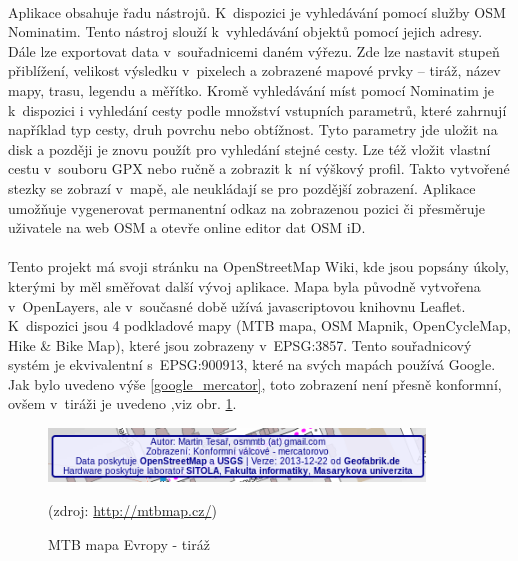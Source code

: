 \documentclass[11pt,a4paper,titlepage,oneside]{book}
\begin{document}
		\paragraph{} Aplikace obsahuje řadu nástrojů. K~dispozici je vyhledávání pomocí služby \ac{OSM} Nominatim\cite{nominatim}. Tento nástroj slouží k~vyhledávání objektů pomocí jejich adresy. Dále lze exportovat data v~souřadnicemi daném výřezu. Zde lze nastavit stupeň přiblížení, velikost výsledku v~pixelech a zobrazené mapové prvky -- tiráž, název mapy, trasu, legendu a měřítko. Kromě vyhledávání míst  pomocí Nominatim je k~dispozici i vyhledání cesty podle množství vstupních parametrů, které zahrnují například typ cesty, druh povrchu nebo obtížnost. Tyto parametry jde uložit na disk a později je znovu použít pro vyhledání stejné cesty. Lze též vložit vlastní cestu v~souboru \ac{GPX} nebo ručně a zobrazit k~ní výškový profil. Takto vytvořené stezky se zobrazí v~mapě, ale neukládají se pro pozdější zobrazení. Aplikace umožňuje vygenerovat permanentní odkaz na zobrazenou pozici či přesměruje uživatele na web \acl{OSM} a otevře online editor dat \ac{OSM} iD.


		\paragraph{} Tento projekt má svoji stránku na OpenStreetMap Wiki, kde jsou popsány úkoly, kterými by měl směřovat další vývoj aplikace. Mapa byla původně vytvořena v~OpenLayers\cite{tesar_bp}, ale v~současné době užívá javascriptovou knihovnu Leaflet. K~dispozici jsou 4 podkladové mapy (MTB mapa, OSM Mapnik, OpenCycleMap, Hike \& Bike Map), které jsou zobrazeny v~EPSG:3857. Tento souřadnicový systém je ekvivalentní s~EPSG:900913, které na svých mapách používá Google. Jak bylo uvedeno výše \ref{google_mercator}, toto zobrazení není přesně konformní, ovšem v~tiráži je uvedeno ,viz obr. \ref{fig:MTB_tiraz}.
		\begin{figure}[!h]
			\begin{center}
				\includegraphics[width=10cm]{obrazky/tiraz.png}
				\caption{MTB mapa Evropy - tiráž}
				(zdroj: \url{http://mtbmap.cz/})
				\label{fig:MTB_tiraz}
			\end{center}
		\end{figure}
\end{document}
